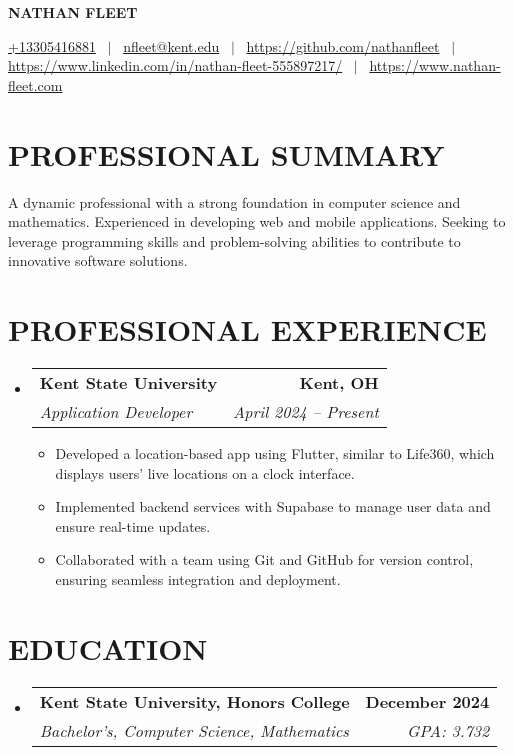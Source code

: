 \documentclass[letterpaper,11pt]{article}
\makeatletter
\newcommand{\resumeItemPlain}[1]{
  \item\small{
    {#1 \vspace{-2pt}}
  }
}
\newcommand{\resumeSubheading}[4]{
  \vspace{-1pt}\item
    \begin{tabular*}{0.97\textwidth}[t]{l@{\extracolsep{\fill}}r}
      \textbf{#1} & \textbf{#2} \\
      \textit{\small#3} & \textit{\small #4} \\
    \end{tabular*}\vspace{-5pt}
}
\newcommand{\resumeItemListStart}{\begin{itemize}[leftmargin=*,label=\textbullet]}
\newcommand{\resumeItemListEnd}{\end{itemize}}
\makeatother
\begin{document}
\begin{center}
  \textbf{\Huge NATHAN FLEET}
\end{center}

\begin{center}
  \href{tel:+13305416881}{+13305416881} \, $\vert$ \,
  \href{mailto:nfleet@kent.edu}{nfleet@kent.edu} \, $\vert$ \,
  \href{https://github.com/yourusername}{https://github.com/nathanfleet} \, $\vert$ \,
  \href{https://linkedin.com/in/yourusername}{https://www.linkedin.com/in/nathan-fleet-555897217/} \, $\vert$ \,
  \href{https://nathan-fleet.com/}{https://www.nathan-fleet.com}
\end{center}

\section{PROFESSIONAL SUMMARY}
  \small{A dynamic professional with a strong foundation in computer science and mathematics. Experienced in developing web and mobile applications. Seeking to leverage programming skills and problem-solving abilities to contribute to innovative software solutions.}

\section{PROFESSIONAL EXPERIENCE}
  \begin{itemize}[leftmargin=0pt,label={}]
    \resumeSubheading
      {Kent State University}{Kent, OH}
      {Application Developer}{April 2024 -- Present}
      \resumeItemListStart
        \resumeItemPlain{}
          { Developed a location-based app using Flutter, similar to Life360, which displays users' live locations on a clock interface. }
        \resumeItemPlain{}
          { Implemented backend services with Supabase to manage user data and ensure real-time updates. }
        \resumeItemPlain{}
          { Collaborated with a team using Git and GitHub for version control, ensuring seamless integration and deployment. }
      \resumeItemListEnd
  \end{itemize}

\section{EDUCATION}
  \begin{itemize}[leftmargin=0pt,label={}]
    \resumeSubheading
      {Kent State University, Honors College}{December 2024}
      {Bachelor's, Computer Science, Mathematics}{GPA: 3.732}
  \end{itemize}
  
\end{document}
